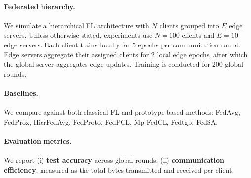 \documentclass[twoside]{article}
\begin{document}
        \paragraph{Federated hierarchy.} 
        We simulate a hierarchical FL architecture with $N$ clients grouped into $E$ edge servers. Unless otherwise stated, experiments use $N=100$ clients and $E=10$ edge servers. Each client trains locally for 5 epochs per communication round. Edge servers aggregate their assigned clients for 2 local edge epochs, after which the global server aggregates edge updates. Training is conducted for 200 global rounds. 
        
        \paragraph{Baselines.} 
        We compare against both classical FL and prototype-based methods: FedAvg, FedProx, HierFedAvg, FedProto, FedPCL, Mp-FedCL, Fedtgp, FedSA.
        \paragraph{Evaluation metrics.} 
        We report (i) \textbf{test accuracy} across global rounds; (ii) \textbf{communication efficiency}, measured as the total bytes transmitted and received per client.
\end{document}
